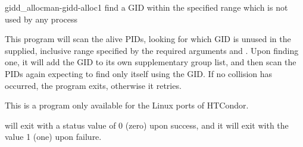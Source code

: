\begin{ManPage}{gidd\_alloc}{man-gidd-alloc}{1}
{find a GID within the specified range which is not used by any process}

\Synopsis {}

\Description 

This program will scan the alive PIDs, looking for which GID is unused in
the supplied, inclusive range specified by the required arguments
 and . 
Upon finding one,
it will add the GID to its own supplementary group list,
and then scan the PIDs again expecting to find only itself using the GID. 
If no collision has occurred, the program exits, otherwise it retries.

	
\GenRem

This is a program only available for the Linux ports of HTCondor.

\ExitStatus

 will exit with a status value of 0 (zero) upon success,
and it will exit with the value 1 (one) upon failure.

\end{ManPage}
